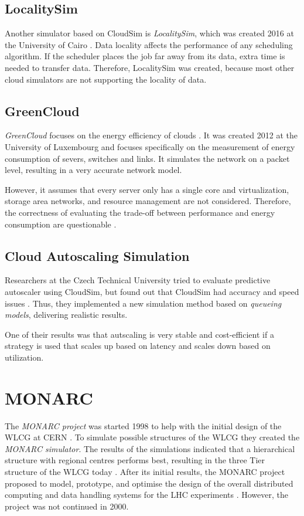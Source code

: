 \subsection{LocalitySim}
Another simulator based on CloudSim is \textit{LocalitySim}, which was created 2016 at the University of Cairo \cite{localitysim}. Data locality affects the performance of any scheduling algorithm. If the scheduler places the job far away from its data, extra time is needed to transfer data. Therefore, LocalitySim was created, because most other cloud simulators are not supporting the locality of data.

\subsection{GreenCloud}
\textit{GreenCloud} focuses on the energy efficiency of clouds \cite{green_cloud}. It was created 2012 
at the University of Luxembourg and focuses specifically on the measurement of energy consumption of severs, switches and links. It simulates the network on a packet level, resulting in a very accurate network model.  

However, it assumes that every server only has a single core and virtualization, storage area networks, and resource management are not considered. Therefore, the correctness of evaluating the trade-off between performance and energy consumption are questionable \cite{survey_clouds}.

\subsection{Cloud Autoscaling Simulation}
Researchers at the Czech Technical University tried to evaluate predictive autoscaler using CloudSim, but found out that CloudSim had accuracy and speed issues \cite{autoscale_cloud}. Thus, they implemented a new simulation method based on \textit{queueing models}, delivering realistic results. 

One of their results was that autscaling is very stable and cost-efficient if a strategy is used that scales up based on latency and scales down based on utilization. 

\section{MONARC}
The \textit{MONARC project} was started 1998 to help with the initial design of the WLCG at CERN \cite{monarc2000models}.
To simulate possible structures of the WLCG they created the \textit{MONARC simulator}.
The results of the simulations indicated that a hierarchical structure with regional centres performs best, resulting in the three Tier structure of the WLCG today \cite{morita2001validation}. 
After its initial results, the MONARC project proposed to model, prototype, and optimise the design of the overall distributed computing and data handling systems for the LHC experiments \cite{monarc2000models}.
However, the project was not continued in 2000.

